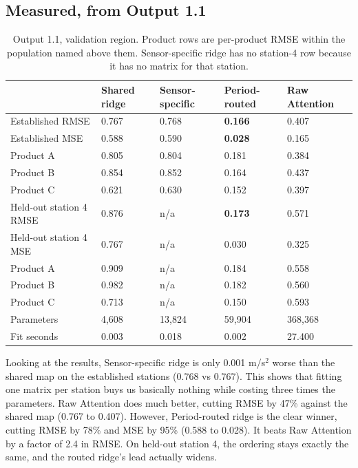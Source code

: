 \documentclass[11pt,letterpaper]{article}
\begin{document}
\subsection*{Measured, from Output 1.1}

\begin{table}[htbp]
\centering
\small
\begin{tabular}{@{}p{1.5in}p{1.0in}p{1.2in}p{1.0in}p{1.0in}@{}}
\toprule
 & \textbf{Shared ridge} & \textbf{Sensor-specific} & \textbf{Period-routed} & \textbf{Raw Attention} \\
\midrule
Established RMSE        & 0.767 & 0.768 & \textbf{0.166} & 0.407 \\
Established MSE         & 0.588 & 0.590 & \textbf{0.028} & 0.165 \\
\quad Product A         & 0.805 & 0.804 & 0.181 & 0.384 \\
\quad Product B         & 0.854 & 0.852 & 0.164 & 0.437 \\
\quad Product C         & 0.621 & 0.630 & 0.152 & 0.397 \\
Held-out station 4 RMSE  & 0.876 & n/a & \textbf{0.173} & 0.571 \\
Held-out station 4 MSE   & 0.767 & n/a & 0.030 & 0.325 \\
\quad Product A         & 0.909 & n/a & 0.184 & 0.558 \\
\quad Product B         & 0.982 & n/a & 0.182 & 0.560 \\
\quad Product C         & 0.713 & n/a & 0.150 & 0.593 \\
Parameters              & 4{,}608 & 13{,}824 & 59{,}904 & 368{,}368 \\
Fit seconds             & 0.003 & 0.018 & 0.002 & 27.400 \\
\bottomrule
\end{tabular}
\caption{Output 1.1, validation region. Product rows are per-product RMSE within the population
named above them. Sensor-specific ridge has no station-4 row because it has no matrix for that
station.}
\label{tab:out11}
\end{table}

Looking at the results, Sensor-specific ridge is only 0.001 m/s$^2$ worse than the shared map on the established stations (0.768 vs 0.767). This shows that fitting one matrix per station buys us basically nothing while costing three times the parameters. Raw Attention does much better, cutting RMSE by 47\% against the shared map (0.767 to 0.407). However, Period-routed ridge is the clear winner, cutting RMSE by 78\% and MSE by 95\% (0.588 to 0.028). It beats Raw Attention by a factor of 2.4 in RMSE. On held-out station 4, the ordering stays exactly the same, and the routed ridge's lead actually widens.
\end{document}
